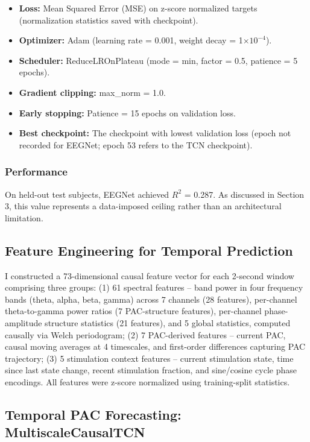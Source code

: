 \documentclass[11pt,letterpaper]{article}
\begin{document}
\begin{itemize}[nosep]
  \item \textbf{Loss:} Mean Squared Error (MSE) on z-score normalized targets (normalization statistics saved with checkpoint).
  \item \textbf{Optimizer:} Adam (learning rate = 0.001, weight decay = 1$\times 10^{-4}$).
  \item \textbf{Scheduler:} ReduceLROnPlateau (mode = min, factor = 0.5, patience = 5 epochs).
  \item \textbf{Gradient clipping:} max\_norm = 1.0.
  \item \textbf{Early stopping:} Patience = 15 epochs on validation loss.
  \item \textbf{Best checkpoint:} The checkpoint with lowest validation loss (epoch not recorded for EEGNet; epoch 53 refers to the TCN checkpoint).
\end{itemize}

\subsubsection{Performance}

On held-out test subjects, EEGNet achieved $R^2$ = 0.287. As discussed in Section 3, this value represents a data-imposed ceiling rather than an architectural limitation.

\subsection{Feature Engineering for Temporal Prediction}

I constructed a 73-dimensional causal feature vector for each 2-second window comprising three groups: (1) 61 spectral features -- band power in four frequency bands (theta, alpha, beta, gamma) across 7 channels (28 features), per-channel theta-to-gamma power ratios (7 PAC-structure features), per-channel phase-amplitude structure statistics (21 features), and 5 global statistics, computed causally via Welch periodogram; (2) 7 PAC-derived features -- current PAC, causal moving averages at 4 timescales, and first-order differences capturing PAC trajectory; (3) 5 stimulation context features -- current stimulation state, time since last state change, recent stimulation fraction, and sine/cosine cycle phase encodings. All features were z-score normalized using training-split statistics.

\subsection{Temporal PAC Forecasting: MultiscaleCausalTCN}
\end{document}
